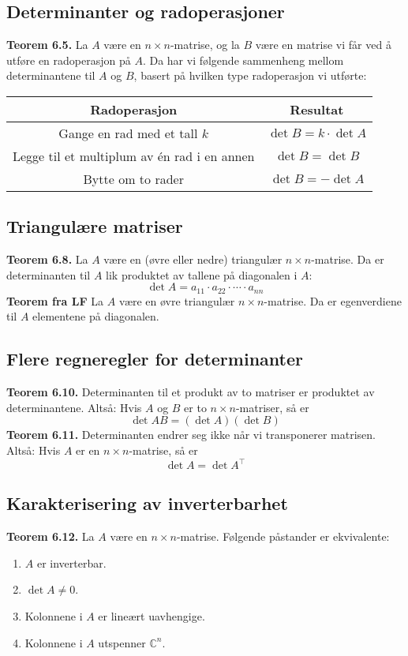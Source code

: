 \documentclass{article}
\begin{document}
\subsection{Determinanter og radoperasjoner}
\textbf{Teorem 6.5.} La $A$ være en $n \times n$-matrise, og la $B$ være en matrise vi får ved å utføre en radoperasjon på $A$. Da har vi følgende sammenheng mellom determinantene til $A$ og $B$, basert på hvilken type radoperasjon vi utførte:
\begin{table}[h]
    \centering
    \begin{tabular}{c|c}
        Radoperasjon & Resultat \\
        \hline 
        Gange en rad med et tall $k$ & $\det{B} = k \cdot \det{A}$ \\
        Legge til et multiplum av én rad i en annen & $\det{B} = \det{B}$ \\
        Bytte om to rader & $\det{B} = -\det{A}$
    \end{tabular}
\end{table}


\subsection{Triangulære matriser}
\textbf{Teorem 6.8.} La $A$ være en (øvre eller nedre) triangulær $n \times n$-matrise. Da er determinanten til $A$ lik produktet av tallene på diagonalen i $A$:
\[ \det{A} = a_{11} \cdot a_{22} \cdot \cdots \cdot a_{nn} \]
\textbf{Teorem fra LF} La $A$ være en øvre triangulær $n \times n$-matrise. Da er egenverdiene til $A$ elementene på diagonalen.


\subsection{Flere regneregler for determinanter}
\textbf{Teorem 6.10.} Determinanten til et produkt av to matriser er produktet av determinantene. Altså: Hvis $A$ og $B$ er to $n \times n$-matriser, så er
\[ \det{AB} = (\det{A})(\det{B}) \]
\textbf{Teorem 6.11.} Determinanten endrer seg ikke når vi transponerer matrisen. Altså: Hvis $A$ er en $n \times n$-matrise, så er
\[ \det{A} = \det{A^{\top}} \]


\subsection{Karakterisering av inverterbarhet}
\textbf{Teorem 6.12.} La $A$ være en $n \times n$-matrise. Følgende påstander er ekvivalente:
\begin{enumerate}
    \item $A$ er inverterbar.
    \item $\det{A} \neq 0$.
    \item Kolonnene i $A$ er lineært uavhengige.
    \item Kolonnene i $A$ utspenner $\mathbb{C}^n$.
\end{enumerate}
\end{document}
